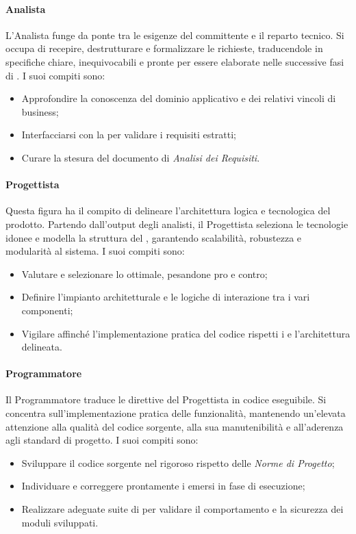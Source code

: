 \documentclass[documento]{gpt}
\begin{document}
	\paragraph{Analista}
	L'Analista funge da ponte tra le esigenze del committente e il reparto tecnico. Si occupa di recepire, destrutturare e formalizzare le richieste, traducendole in specifiche chiare, inequivocabili e pronte per essere elaborate nelle successive fasi di .
	I suoi compiti sono:
	\begin{itemize}
		\item Approfondire la conoscenza del dominio applicativo e dei relativi vincoli di business;
		\item Interfacciarsi con la  per validare i requisiti estratti;
		\item Curare la stesura del documento di \textit{Analisi dei Requisiti}.
	\end{itemize}
	
	\paragraph{Progettista}
	Questa figura ha il compito di delineare l'architettura logica e tecnologica del prodotto. Partendo dall'output degli analisti, il Progettista seleziona le tecnologie idonee e modella la struttura del , garantendo scalabilità, robustezza e modularità al sistema.
	I suoi compiti sono:
	\begin{itemize}
		\item Valutare e selezionare lo  ottimale, pesandone pro e contro;
		\item Definire l'impianto architetturale e le logiche di interazione tra i vari componenti;
		\item Vigilare affinché l'implementazione pratica del codice rispetti i  e l'architettura delineata.
	\end{itemize}
	
	\paragraph{Programmatore}
	Il Programmatore traduce le direttive del Progettista in codice eseguibile. Si concentra sull'implementazione pratica delle funzionalità, mantenendo un'elevata attenzione alla qualità del codice sorgente, alla sua manutenibilità e all'aderenza agli standard di progetto.
	I suoi compiti sono:
	\begin{itemize}
		\item Sviluppare il codice sorgente nel rigoroso rispetto delle \textit{Norme di Progetto};
		\item Individuare e correggere prontamente i  emersi in fase di esecuzione;
		\item Realizzare adeguate suite di  per validare il comportamento e la sicurezza dei moduli sviluppati.
	\end{itemize}
	
\end{document}
